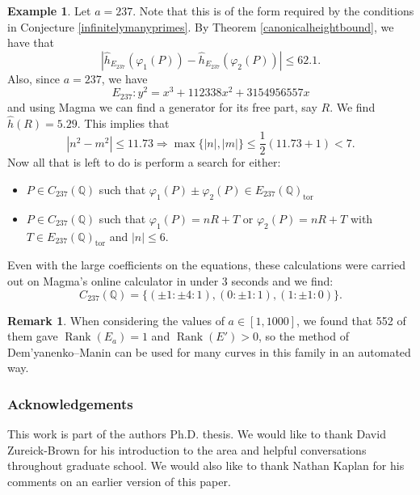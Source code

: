 \documentclass{article}
\newcommand{\Q}{\mathbb{Q}}
\theoremstyle{definition}
\newtheorem{example}{Example}
\newtheorem{remark}{Remark}
\DeclareMathOperator{\Rank}{Rank}
\begin{document}
\begin{example}
    Let $a = 237$. Note that this is of the form required by the conditions in Conjecture \ref{infinitelymanyprimes}. By Theorem \ref{canonicalheightbound}, we have that
    \begin{equation*}
        \left| \hat{h}_{E_{237}}(\varphi_1(P)) - \hat{h}_{E_{237}}(\varphi_2(P)) \right| \leq 62.1.
    \end{equation*}
    Also, since $a = 237$, we have 
    \begin{equation*}
        E_{237} : y^2 = x^3 + 112338x^2 + 3154956557x
    \end{equation*}
    and using Magma we can find a generator for its free part, say $R$. We find $\hat{h}(R) = 5.29$. This implies that 
    \begin{equation*}
        \left|n^2 - m^2\right| \leq 11.73 \Rightarrow \max \{ |n|, |m| \} \leq \frac{1}{2} (11.73 + 1) < 7.
        \end{equation*}
        Now all that is left to do is perform a search for either: 
    \begin{itemize}
        \item $P \in C_{237}(\Q)$ such that $\varphi_1(P) \pm \varphi_2(P) \in E_{237}(\Q)_{\text{tor}}$
        \item $P \in C_{237}(\Q)$ such that $\varphi_1(P) = nR + T$ or $\varphi_2(P) = nR + T$ with $T \in E_{237}(\Q)_{\text{tor}}$ and $|n| \leq 6$.
    \end{itemize}
    Even with the large coefficients on the equations, these calculations were carried out on Magma's online calculator in under 3 seconds and we find:
    \begin{equation*}
        C_{237}(\Q) = \{(\pm 1: \pm 4: 1), (0: \pm 1: 1), (1: \pm 1: 0) \}.
    \end{equation*}
\end{example}

\begin{remark}
    When considering the values of $a \in [1,1000]$, we found that 552 of them gave $\Rank(E_a) = 1$ and $\Rank(E') > 0$, so the method of Dem'yanenko--Manin can be used for many curves in this family in an automated way.
\end{remark}

\subsubsection*{Acknowledgements} This work is part of the authors Ph.D. thesis. We would like to thank David Zureick-Brown for his introduction to the area and helpful conversations throughout graduate school. We would also like to thank Nathan Kaplan for his comments on an earlier version of this paper.
\end{document}
